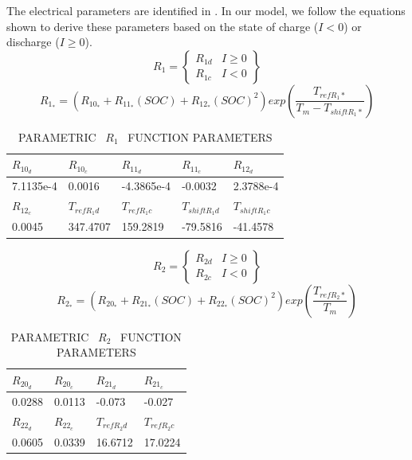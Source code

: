 \documentclass[10pt]{article}
\begin{document}
\noindent The electrical parameters are identified in \cite{ref:1}. In our model, we follow the equations shown to derive these parameters based on the state of charge ($I<0$) or discharge ($I\ge 0$).
\begin{equation}
R_{1} = \begin{Bmatrix}
R_{1d}&I\ge 0\\
R_{1c} &I<0
\end{Bmatrix}    
\end{equation}
\begin{equation}
R_{1_{*}}=(R_{10_{*}}+R_{11_{*}}(SOC)+R_{12_{*}}(SOC)^{2})exp\left ( \frac{T_{refR_{1}*}}{T_m-T_{shiftR_{1}*}} \right )
\end{equation}
\begin{table}[H]
	\caption{PARAMETRIC \ $R_1$ \ FUNCTION PARAMETERS}
	\vspace{-0.4cm}
	\centering
	\begin{tabular}{lllll}
		\hline
		$R_{10_{d}}$ & $R_{10_{c}}$ & $R_{11_{d}}$ & $R_{11_{c}}$ &$R_{12_{d}}$  \\
		\hline
		7.1135e-4 & 0.0016 & -4.3865e-4 & -0.0032 & 2.3788e-4 \\
		\hline
		$R_{12_{c}}$ & $T_{refR_{1}d}$& $T_{refR_{1}c}$ &$T_{shiftR_{1}d}$ & $T_{shiftR_{1}c}$\\
		\hline
		0.0045 & 347.4707 & 159.2819 & -79.5816 & -41.4578 \\
		\hline
	\end{tabular}
\end{table}
\begin{equation}
R_{2} = 
\begin{Bmatrix}
R_{2d}&I\ge 0\\
R_{2c} &I<0
\end{Bmatrix}
\end{equation}
\begin{equation}
R_{2_{*}}=(R_{20_{*}}+R_{21_{*}}(SOC)+R_{22_{*}}(SOC)^{2})exp\left ( \frac{T_{refR_{2}*}}{T_m} \right )
\end{equation}
\begin{table}[H]
	\caption{PARAMETRIC \ $R_2$ \ FUNCTION PARAMETERS}
	\vspace{-0.4cm}
	\centering
	\begin{tabular}{llll}
		\hline
		$R_{20_{d}}$ & $R_{20_{c}}$ & $R_{21_{d}}$ & $R_{21_{c}}$ \\
		\hline
		0.0288 & 0.0113 & -0.073 & -0.027  \\
		\hline
		$R_{22_{d}}$ & $R_{22_{c}}$& $T_{refR_{2}d}$& $T_{refR_{2}c}$ \\
		\hline
		0.0605 & 0.0339 & 16.6712 & 17.0224 \\
		\hline
	\end{tabular}
\end{table}
\end{document}

